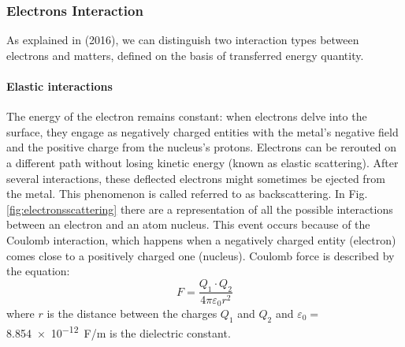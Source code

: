 \subsubsection{Electrons Interaction}
\label{sssec:electroninteractions}
As explained in \citeauthor{korner_additive_2016} (2016), we can distinguish two interaction types between electrons and matters, defined on the basis of transferred energy quantity. 
\paragraph{Elastic interactions} The energy of the electron remains constant: when electrons delve into the surface, they engage as negatively charged entities with the metal's negative field and the positive charge from the nucleus's protons. Electrons can be rerouted on a different path without losing kinetic energy (known as elastic scattering). After several interactions, these deflected electrons might sometimes be ejected from the metal. This phenomenon is called referred to as backscattering. In Fig. \ref{fig:electronsscattering} there are a representation of all the possible interactions between an electron and an atom nucleus. This event occurs because of the Coulomb interaction, which happens when a negatively charged entity (electron) comes close to a positively charged one (nucleus). Coulomb force is described by the equation:
\begin{equation}
    \label{eq:coulomb}
    F=\frac{Q_1\cdot Q_2}{4\pi \varepsilon_0 r^2}
\end{equation}
where $r$ is the distance between the charges $Q_1$ and $Q_2$ and $\varepsilon_0=$ \SI{8.854e-12}{\farad / \metre} is the dielectric constant. 
